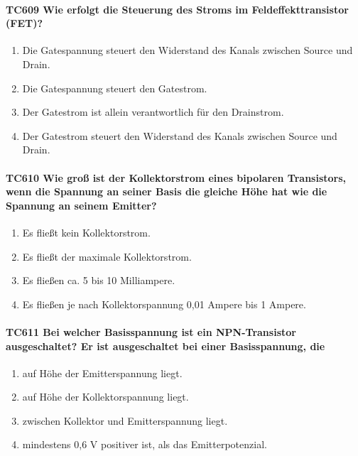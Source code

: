 \documentclass[8pt]{article}
\begin{document}
\begin{enumerate}
\begin{enumerate}[nolistsep,label=\Alph*]
{\begin{enumerate}[nolistsep,label=\Alph*]
\paragraph*{TC609 Wie erfolgt die Steuerung des Stroms im Feldeffekttransistor (FET)?}
\begin{enumerate}[nolistsep,label=\Alph*]
\item Die Gatespannung steuert den Widerstand des Kanals zwischen Source und Drain.
\item Die Gatespannung steuert den Gatestrom.
\item Der Gatestrom ist allein verantwortlich für den Drainstrom.
\item Der Gatestrom steuert den Widerstand des Kanals zwischen Source und Drain.
\end{enumerate}

\paragraph*{TC610 Wie groß ist der Kollektorstrom eines bipolaren Transistors, wenn die Spannung an seiner Basis die gleiche Höhe hat wie die Spannung an seinem Emitter?}
\begin{enumerate}[nolistsep,label=\Alph*]
\item Es fließt kein Kollektorstrom.
\item Es fließt der maximale Kollektorstrom.
\item Es fließen ca. 5 bis 10 Milliampere.
\item Es fließen je nach Kollektorspannung 0,01 Ampere bis 1 Ampere.
\end{enumerate}

\paragraph*{TC611 Bei welcher Basisspannung ist ein NPN-Transistor ausgeschaltet? Er ist ausgeschaltet bei einer Basisspannung, die}
\begin{enumerate}[nolistsep,label=\Alph*]
\item auf Höhe der Emitterspannung liegt.
\item auf Höhe der Kollektorspannung liegt.
\item zwischen Kollektor und Emitterspannung liegt.
\item mindestens 0,6 V positiver ist, als das Emitterpotenzial.
\end{enumerate}


\end{enumerate}}
\end{enumerate}
\end{enumerate}
\end{document}
